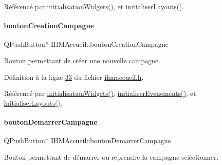Référencé par \hyperlink{ihmaccueil_8cpp_source_l00037}{initialisation\+Widgets()}, et \hyperlink{ihmaccueil_8cpp_source_l00049}{initialiser\+Layouts()}.

\mbox{\label{class_i_h_m_accueil_a4186b4ef6a9c63f5b3c6431626ff3268}} 
\paragraph{\texorpdfstring{bouton\+Creation\+Campagne}{boutonCreationCampagne}}
{\footnotesize\ttfamily Q\+Push\+Button$\ast$ I\+H\+M\+Accueil\+::bouton\+Creation\+Campagne\hspace{0.3cm}{\ttfamily [private]}}



Bouton permettant de créer une nouvelle campagne. 



Définition à la ligne \hyperlink{ihmaccueil_8h_source_l00033}{33} du fichier \hyperlink{ihmaccueil_8h_source}{ihmaccueil.\+h}.



Référencé par \hyperlink{ihmaccueil_8cpp_source_l00037}{initialisation\+Widgets()}, \hyperlink{ihmaccueil_8cpp_source_l00084}{initialiser\+Evenements()}, et \hyperlink{ihmaccueil_8cpp_source_l00049}{initialiser\+Layouts()}.

\mbox{\label{class_i_h_m_accueil_a9fd8ab3abc0c1e6addd70c8d7c46fb65}} 
\paragraph{\texorpdfstring{bouton\+Demarrer\+Campagne}{boutonDemarrerCampagne}}
{\footnotesize\ttfamily Q\+Push\+Button$\ast$ I\+H\+M\+Accueil\+::bouton\+Demarrer\+Campagne\hspace{0.3cm}{\ttfamily [private]}}



Bouton permettant de démarrer ou reprendre la campagne seléctionner. 



